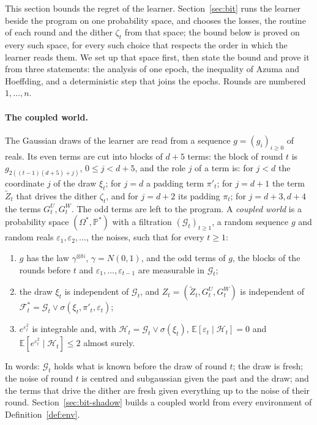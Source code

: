 \documentclass[11pt]{amsart}
\theoremstyle{definition}
\numberwithin{equation}{section}
\newcommand{\E}{\mathbb{E}}
\newcommand{\Prob}{\mathbb{P}}
\newcommand{\cG}{\mathscr{G}}
\newcommand{\cF}{\mathscr{F}}
\newcommand{\cH}{\mathscr{H}}
\begin{document}
This section bounds the regret of the learner. Section~\ref{sec:bit} runs the learner beside the program on one probability space, and chooses the losses, the routine of each round and the dither $\zeta_t$ from that space; the bound below is proved on every such space, for every such choice that respects the order in which the learner reads them. We set up that space first, then state the bound and prove it from three statements: the analysis of one epoch, the inequality of Azuma and Hoeffding, and a deterministic step that joins the epochs. Rounds are numbered $1,\dots,n$.

\paragraph{The coupled world.} The Gaussian draws of the learner are read from a sequence $g=(g_i)_{i\ge0}$ of reals. Its even terms are cut into blocks of $d+5$ terms: the block of round $t$ is $g_{2((t-1)(d+5)+j)}$, $0\le j<d+5$, and the role $j$ of a term is: for $j<d$ the coordinate $j$ of the draw $\xi_t$; for $j=d$ a padding term $\pi'_t$; for $j=d+1$ the term $\tilde Z_t$ that drives the dither $\zeta_t$, and for $j=d+2$ its padding $\pi_t$; for $j=d+3,d+4$ the terms $G^U_t,G^W_t$. The odd terms are left to the program. A \emph{coupled world} is a probability space $(\Omega^*,\Prob^*)$ with a filtration $(\cG_t)_{t\ge1}$, a random sequence $g$ and random reals $\varepsilon_1,\varepsilon_2,\dots$, the noises, such that for every $t\ge1$:
\begin{enumerate}[label=(W\arabic*),start=0]
\item $g$ has the law $\gamma^{\otimes\mathbb N}$, $\gamma=N(0,1)$, and the odd terms of $g$, the blocks of the rounds before $t$ and $\varepsilon_1,\dots,\varepsilon_{t-1}$ are measurable in $\cG_t$;
\item the draw $\xi_t$ is independent of $\cG_t$, and $Z_t=(\tilde Z_t,G^U_t,G^W_t)$ is independent of $\cF^*_t=\cG_t\vee\sigma(\xi_t,\pi'_t,\varepsilon_t)$;
\item $e^{\varepsilon_t^2}$ is integrable and, with $\cH_t=\cG_t\vee\sigma(\xi_t)$, $\E[\varepsilon_t\mid\cH_t]=0$ and $\E[e^{\varepsilon_t^2}\mid\cH_t]\le2$ almost surely.
\end{enumerate}
In words: $\cG_t$ holds what is known before the draw of round $t$; the draw is fresh; the noise of round $t$ is centred and subgaussian given the past and the draw; and the terms that drive the dither are fresh given everything up to the noise of their round. Section~\ref{sec:bit-shadow} builds a coupled world from every environment of Definition~\ref{def:env}.
\end{document}
